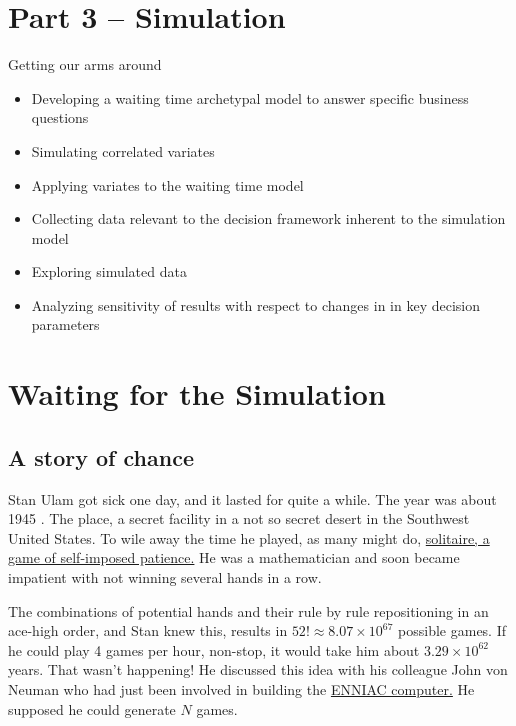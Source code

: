 \documentclass[
]{book}
\begin{document}
\hypertarget{part-3-simulation}{%
\chapter*{Part 3 -- Simulation}\label{part-3-simulation}}

Getting our arms around

\begin{itemize}
\item
  Developing a waiting time archetypal model to answer specific business questions
\item
  Simulating correlated variates
\item
  Applying variates to the waiting time model
\item
  Collecting data relevant to the decision framework inherent to the simulation model
\item
  Exploring simulated data
\item
  Analyzing sensitivity of results with respect to changes in in key decision parameters
\end{itemize}

\hypertarget{waiting-for-the-simulation}{%
\chapter{Waiting for the Simulation}\label{waiting-for-the-simulation}}

\hypertarget{a-story-of-chance}{%
\section{A story of chance}\label{a-story-of-chance}}

Stan Ulam got sick one day, and it lasted for quite a while. The year was about 1945 . The place, a secret facility in a not so secret desert in the Southwest United States. To wile away the time he played, as many might do, \href{https://en.wikipedia.org/wiki/Patience_(game)}{solitaire, a game of self-imposed patience.} He was a mathematician and soon became impatient with not winning several hands in a row.

The combinations of potential hands and their rule by rule repositioning in an ace-high order, and Stan knew this, results in \(52! \approx 8.07 \times 10^{67}\) possible games. If he could play 4 games per hour, non-stop, it would take him about \(3.29 \times 10^{62}\) years. That wasn't happening! He discussed this idea with his colleague John von Neuman who had just been involved in building the \href{}{ENNIAC computer.} He supposed he could generate \(N\) games.
\end{document}
